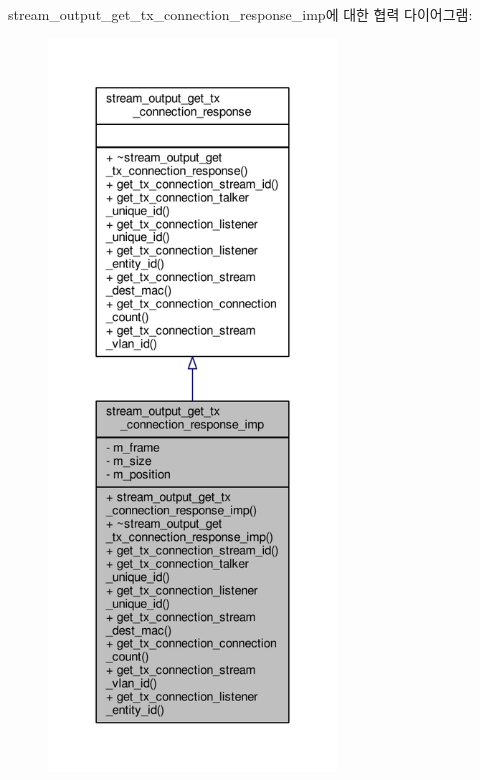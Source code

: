 stream\+\_\+output\+\_\+get\+\_\+tx\+\_\+connection\+\_\+response\+\_\+imp에 대한 협력 다이어그램\+:
\nopagebreak
\begin{figure}[H]
\begin{center}
\leavevmode
\includegraphics[height=550pt]{classavdecc__lib_1_1stream__output__get__tx__connection__response__imp__coll__graph}
\end{center}
\end{figure}
